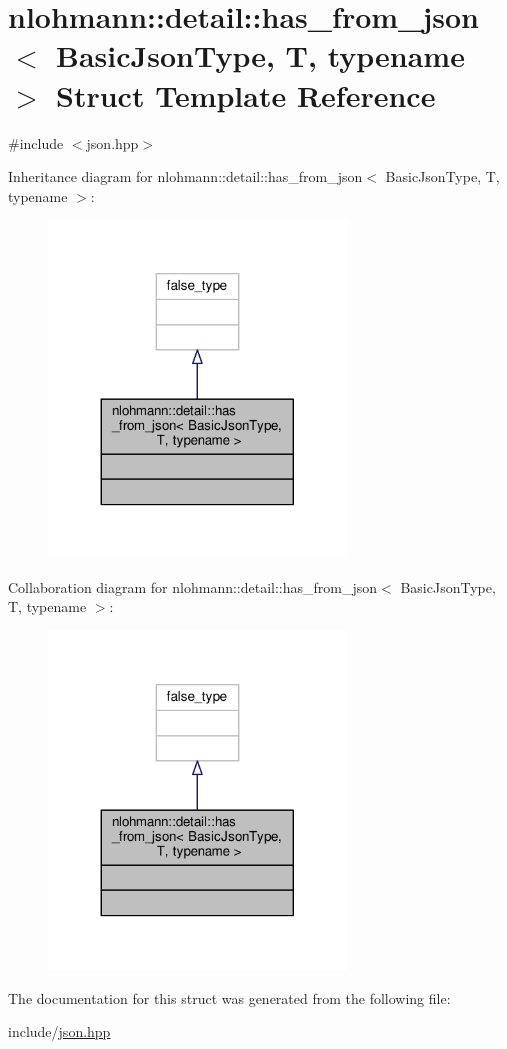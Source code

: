 \hypertarget{structnlohmann_1_1detail_1_1has__from__json}{}\section{nlohmann\+:\+:detail\+:\+:has\+\_\+from\+\_\+json$<$ Basic\+Json\+Type, T, typename $>$ Struct Template Reference}
\label{structnlohmann_1_1detail_1_1has__from__json}


{\ttfamily \#include $<$json.\+hpp$>$}



Inheritance diagram for nlohmann\+:\+:detail\+:\+:has\+\_\+from\+\_\+json$<$ Basic\+Json\+Type, T, typename $>$\+:
\nopagebreak
\begin{figure}[H]
\begin{center}
\leavevmode
\includegraphics[width=224pt]{structnlohmann_1_1detail_1_1has__from__json__inherit__graph}
\end{center}
\end{figure}


Collaboration diagram for nlohmann\+:\+:detail\+:\+:has\+\_\+from\+\_\+json$<$ Basic\+Json\+Type, T, typename $>$\+:
\nopagebreak
\begin{figure}[H]
\begin{center}
\leavevmode
\includegraphics[width=224pt]{structnlohmann_1_1detail_1_1has__from__json__coll__graph}
\end{center}
\end{figure}


The documentation for this struct was generated from the following file\+:\begin{DoxyCompactItemize}
\item 
include/\hyperlink{json_8hpp}{json.\+hpp}\end{DoxyCompactItemize}
